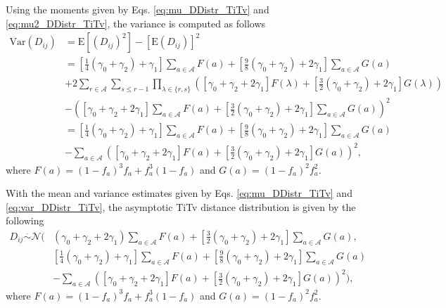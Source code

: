 \documentclass[10pt,letterpaper]{article}\usepackage[]{graphicx}\usepackage[]{color}
\begin{document}
Using the moments given by Eqs. \ref{eq:mu_DDistr_TiTv} and \ref{eq:mu2_DDistr_TiTv}, the variance is computed as follows
%
\begin{equation}\label{eq:var_DDistr_TiTv}
\begin{aligned}
\text{Var}(D_{ij}) &= \text{E}\left[(D_{ij})^2\right] - \left[\text{E}(D_{ij})\right]^2 \\
&=\left[\frac{1}{4}(\gamma_0 + \gamma_2) + \gamma_1\right] \sum_{a \in \mathcal{A}} F(a) + \left[\frac{9}{8}(\gamma_0 + \gamma_2) + 2\gamma_1\right] \sum_{a \in \mathcal{A}} G(a) \\
&+ 2 \sum_{r \in \mathcal{A}} \sum_{s \leq r - 1} \prod_{\lambda \in \{r,s\}} \left([\gamma_0 + \gamma_2 + 2\gamma_1] F(\lambda) + \left[\frac{3}{2}(\gamma_0 + \gamma_2) + 2\gamma_1\right] G(\lambda)\right) \\
&- \left([\gamma_0 + \gamma_2 + 2\gamma_1] \sum_{a \in \mathcal{A}} F(a) + \left[\frac{3}{2}(\gamma_0 + \gamma_2) + 2\gamma_1\right] \sum_{a \in \mathcal{A}} G(a)\right)^2 \\
&=\left[\frac{1}{4}(\gamma_0 + \gamma_2) + \gamma_1\right] \sum_{a \in \mathcal{A}} F(a) + \left[\frac{9}{8}(\gamma_0 + \gamma_2) + 2\gamma_1\right] \sum_{a \in \mathcal{A}} G(a) \\
&- \sum_{a \in \mathcal{A}} \left([\gamma_0 + \gamma_2 + 2\gamma_1] F(a) + \left[\frac{3}{2}(\gamma_0 + \gamma_2) + 2\gamma_1\right] G(a)\right)^2,
\end{aligned}
\end{equation}
where $F(a) = (1 - f_a)^3 f_a + f^3_a (1 - f_a)$ and $G(a) = (1 - f_a)^2 f^2_a$.

With the mean and variance estimates given by Eqs. \ref{eq:mu_DDistr_TiTv} and \ref{eq:var_DDistr_TiTv}, the asymptotic TiTv distance distribution is given by the following
%
\begin{equation}\label{eq:DDistr_TiTv}
\begin{aligned}
D_{ij} \overset{.}{\sim} \mathcal{N}\Biggl(& (\gamma_0 + \gamma_2 + 2\gamma_1) \sum_{a \in \mathcal{A}} F(a) + \left[\frac{3}{2}(\gamma_0 + \gamma_2) + 2\gamma_1\right] \sum_{a \in \mathcal{A}} G(a), \\
&\left[\frac{1}{4}(\gamma_0 + \gamma_2) + \gamma_1\right] \sum_{a \in \mathcal{A}} F(a) + \left[\frac{9}{8}(\gamma_0 + \gamma_2) + 2\gamma_1\right] \sum_{a \in \mathcal{A}} G(a) \\
&- \sum_{a \in \mathcal{A}} \left([\gamma_0 + \gamma_2 + 2\gamma_1] F(a) + \left[\frac{3}{2}(\gamma_0 + \gamma_2) + 2\gamma_1\right] G(a)\right)^2\Biggr),
\end{aligned}
\end{equation}
where $F(a) = (1 - f_a)^3 f_a + f^3_a (1 - f_a)$ and $G(a) = (1 - f_a)^2 f^2_a$.
\end{document}
